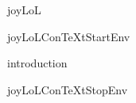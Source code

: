 
\usemodule[t-diSimp]

\startDiSimpComponent joyLoL

\diSimpEnvironment joyLoLConTeXtStartEnv

\diSimpComponent introduction






\diSimpEnvironment joyLoLConTeXtStopEnv

\stopDiSimpComponent
